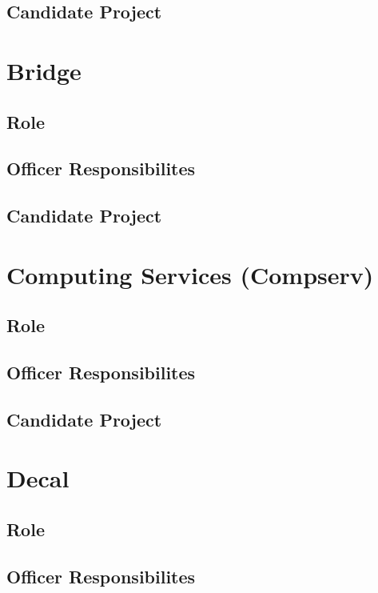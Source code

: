 \documentclass[11pt, article, oneside]{memoir}
\begin{document}
    \subsection{Candidate Project}

    \section{Bridge}
    \subsection{Role}

    \subsection{Officer Responsibilites}

    \subsection{Candidate Project}

    \bigbreak


    \section{Computing Services (Compserv)}
    \subsection{Role}

    \subsection{Officer Responsibilites}

    \subsection{Candidate Project}

    \bigbreak

    
    \section{Decal}
    \subsection{Role}

    \subsection{Officer Responsibilites}
\end{document}
